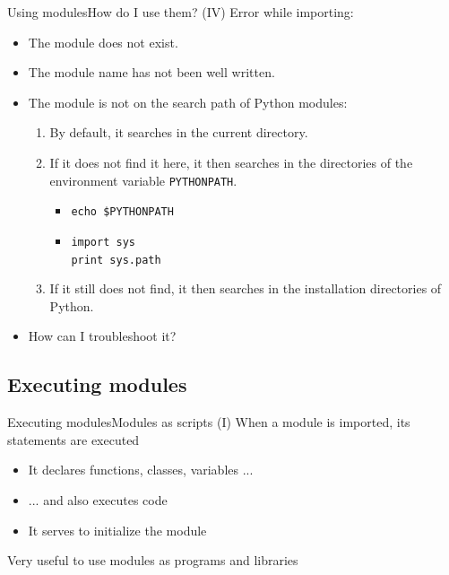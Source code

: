 \documentclass[10pt,compress]{beamer} %
\begin{document}
\begin{frame}[fragile]{Using modules}{How do I use them?  (IV)}
	Error while importing:
	\begin{itemize}
	\item The module does not exist.
	\item The module name has not been well written.
	\item The module is not on the search path of Python modules:
	\begin{enumerate}
	\item By default, it searches in the current directory.
	\item If it does not find it here, it then searches in the directories of the environment variable \texttt{PYTHONPATH}.
	\begin{itemize}
	\item \texttt{echo \$PYTHONPATH}
	\item \texttt{import sys}\\
	\texttt{print sys.path}
	\end{itemize}
	\item If it still does not find, it then searches in the installation directories of Python.
	\end{enumerate}
	\item How can I troubleshoot it?
	\end{itemize}
\end{frame} 
	
\subsection{Executing modules}

\begin{frame}{Executing modules}{Modules as scripts (I)}
	When a module is imported, its statements are executed
		\begin{itemize}
		\item It declares functions, classes, variables ...
		\item ... and also executes code
		\item It serves to initialize the module
		\end{itemize}
	Very useful to use modules as programs and libraries
\end{frame}
\end{document}
